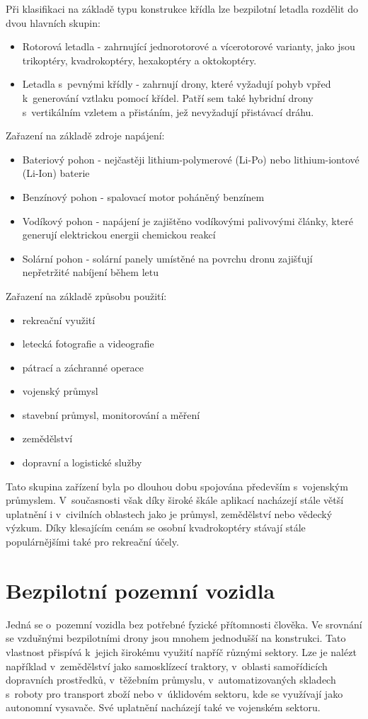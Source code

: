 \documentclass[12pt]{report}
\begin{document}
Při klasifikaci na základě typu konstrukce křídla lze bezpilotní letadla rozdělit do dvou hlavních skupin:
\begin{itemize}
	\item Rotorová letadla - zahrnující jednorotorové a vícerotorové varianty, jako jsou trikoptéry, kvadrokoptéry, hexakoptéry a oktokoptéry.
	\item Letadla s~pevnými křídly - zahrnují drony, které vyžadují pohyb vpřed k~generování vztlaku pomocí křídel. Patří sem také hybridní drony s~vertikálním vzletem a přistáním, jež nevyžadují přistávací dráhu.
\end{itemize}

Zařazení na základě zdroje napájení:
\begin{itemize}
	\item Bateriový pohon - nejčastěji lithium-polymerové (Li-Po) nebo lithium-iontové (Li-Ion) baterie
	\item Benzínový pohon - spalovací motor poháněný benzínem
	\item Vodíkový pohon - napájení je zajištěno vodíkovými palivovými články, které generují elektrickou energii chemickou reakcí
	\item Solární pohon - solární panely umístěné na povrchu dronu zajišťují nepřetržité nabíjení během letu
\end{itemize}

Zařazení na základě způsobu použití:
\begin{itemize}
	\item rekreační využití
	\item letecká fotografie a videografie
	\item pátrací a záchranné operace
	\item vojenský průmysl
	\item stavební průmysl, monitorování a měření
	\item zemědělství
	\item dopravní a logistické služby
\end{itemize}

Tato skupina zařízení byla po dlouhou dobu spojována především s~vojenským průmyslem. V~současnosti však díky široké škále aplikací nacházejí stále větší uplatnění i v~civilních oblastech jako je průmysl, zemědělství nebo vědecký výzkum. Díky klesajícím cenám se osobní kvadrokoptéry stávají stále populárnějšími také pro rekreační účely. \cite{mainbook} \cite{whatisadrone}

\section[Bezpilotní pozemní vozidla]{Bezpilotní pozemní vozidla}
Jedná se o~pozemní vozidla bez potřebné fyzické přítomnosti člověka. Ve srovnání se vzdušnými bezpilotními drony jsou mnohem jednodušší na konstrukci. Tato vlastnost přispívá k~jejich širokému využití napříč různými sektory. Lze je nalézt například v~zemědělství jako samosklízecí traktory, v~oblasti samořídicích dopravních prostředků, v~těžebním průmyslu, v~automatizovaných skladech s~roboty pro transport zboží nebo v~úklidovém sektoru, kde se využívají jako autonomní vysavače. Své uplatnění nacházejí také ve vojenském sektoru. \cite{mainbook}
\end{document}
